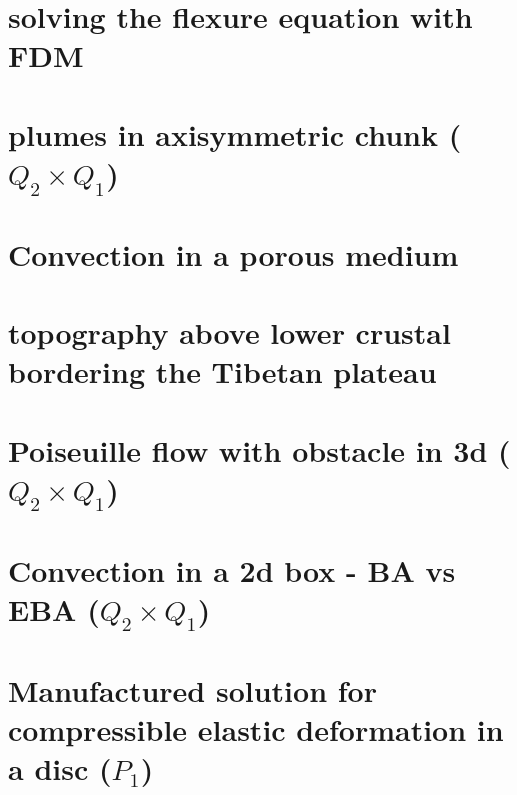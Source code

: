 \documentclass[a4paper,11pt]{report}
\begin{document}
\chapter{solving the flexure equation with FDM  \label{f105}} %

\chapter{plumes in axisymmetric chunk ($Q_2\times Q_1$)  \label{f106}} %

\chapter{Convection in a porous medium  \label{f107}} %

\chapter{topography above lower crustal bordering the Tibetan plateau \label{f108}} %

\chapter{Poiseuille flow with obstacle in 3d ($Q_2\times Q_1$) \label{f109}} %

\chapter{Convection in a 2d box - BA vs EBA ($Q_2\times Q_1$) \label{f110}} %

\chapter{Manufactured solution for compressible elastic deformation in a disc ($P_1$)\label{f111}} %
\end{document}
